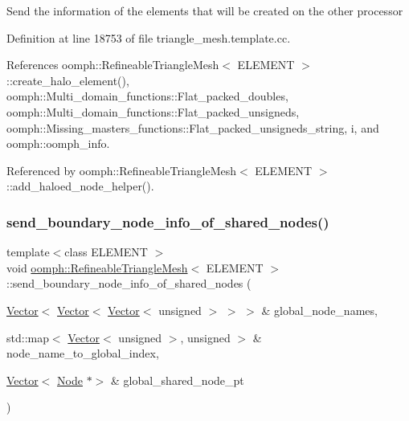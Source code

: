 Send the information of the elements that will be created on the other processor 

Definition at line 18753 of file triangle\+\_\+mesh.\+template.\+cc.



References oomph\+::\+Refineable\+Triangle\+Mesh$<$ E\+L\+E\+M\+E\+N\+T $>$\+::create\+\_\+halo\+\_\+element(), oomph\+::\+Multi\+\_\+domain\+\_\+functions\+::\+Flat\+\_\+packed\+\_\+doubles, oomph\+::\+Multi\+\_\+domain\+\_\+functions\+::\+Flat\+\_\+packed\+\_\+unsigneds, oomph\+::\+Missing\+\_\+masters\+\_\+functions\+::\+Flat\+\_\+packed\+\_\+unsigneds\+\_\+string, i, and oomph\+::oomph\+\_\+info.



Referenced by oomph\+::\+Refineable\+Triangle\+Mesh$<$ E\+L\+E\+M\+E\+N\+T $>$\+::add\+\_\+haloed\+\_\+node\+\_\+helper().

\mbox{\label{classoomph_1_1RefineableTriangleMesh_a995a2a4b90565b3d53e06fdc2ed24be1}} 
\subsubsection{\texorpdfstring{send\+\_\+boundary\+\_\+node\+\_\+info\+\_\+of\+\_\+shared\+\_\+nodes()}{send\_boundary\_node\_info\_of\_shared\_nodes()}}
{\footnotesize\ttfamily template$<$class E\+L\+E\+M\+E\+NT $>$ \\
void \hyperlink{classoomph_1_1RefineableTriangleMesh}{oomph\+::\+Refineable\+Triangle\+Mesh}$<$ E\+L\+E\+M\+E\+NT $>$\+::send\+\_\+boundary\+\_\+node\+\_\+info\+\_\+of\+\_\+shared\+\_\+nodes (\begin{DoxyParamCaption}\item[{\hyperlink{classoomph_1_1Vector}{Vector}$<$ \hyperlink{classoomph_1_1Vector}{Vector}$<$ \hyperlink{classoomph_1_1Vector}{Vector}$<$ unsigned $>$ $>$ $>$ \&}]{global\+\_\+node\+\_\+names,  }\item[{std\+::map$<$ \hyperlink{classoomph_1_1Vector}{Vector}$<$ unsigned $>$, unsigned $>$ \&}]{node\+\_\+name\+\_\+to\+\_\+global\+\_\+index,  }\item[{\hyperlink{classoomph_1_1Vector}{Vector}$<$ \hyperlink{classoomph_1_1Node}{Node} $\ast$$>$ \&}]{global\+\_\+shared\+\_\+node\+\_\+pt }\end{DoxyParamCaption})\hspace{0.3cm}{\ttfamily [protected]}}



